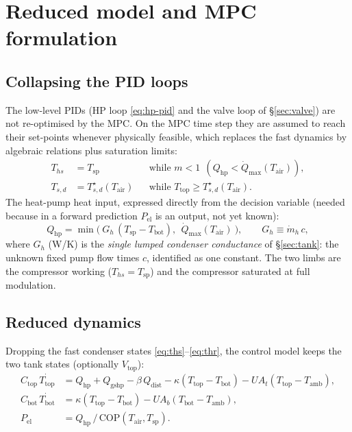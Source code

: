 \documentclass[11pt,a4paper]{article}
\newcommand{\COP}{\mathrm{COP}}
\newcommand{\Qmax}{\dot{Q}_{\max}}
\newcommand{\Ttop}{T_{\mathrm{top}}}
\newcommand{\Tbot}{T_{\mathrm{bot}}}
\newcommand{\Ths}{T_{hs}}          %
\newcommand{\Tsp}{T_{\mathrm{sp}}} %
\newcommand{\Tair}{T_{\mathrm{air}}}
\newcommand{\Tamb}{T_{\mathrm{amb}}}
\newcommand{\Tsd}{T_{s,d}}         %
\newcommand{\Tsdref}{T_{s,d}^{\star}}
\newcommand{\mh}{\dot m_h}         %
\newcommand{\Qhp}{Q_{\mathrm{hp}}}
\newcommand{\Pel}{P_{\mathrm{el}}}
\newcommand{\Vtop}{V_{\mathrm{top}}}
\newcommand{\cw}{c}                %
\begin{document}
\section{Reduced model and MPC formulation}
\label{sec:mpc}

\subsection{Collapsing the PID loops}
The low-level PIDs (HP loop \eqref{eq:hp-pid} and the valve loop of \S\ref{sec:valve}) are not re-optimised
by the MPC. On the MPC time step they are assumed to reach their set-points whenever
physically feasible, which replaces the fast dynamics by algebraic relations plus
saturation limits:
\begin{align}
  \Ths &= \Tsp & &\text{while } m<1 \ \ (\Qhp<\Qmax(\Tair)), \label{eq:collapse1}\\
  \Tsd &= \Tsdref(\Tair) & &\text{while } \Ttop\ge \Tsdref(\Tair). \label{eq:collapse2}
\end{align}
The heat-pump heat input, expressed directly from the decision variable (needed
because in a forward prediction $\Pel$ is an output, not yet known):
\begin{equation}
  \Qhp = \min\!\Big(\ G_h\,(\Tsp-\Tbot),\ \ \Qmax(\Tair)\ \Big),
  \qquad G_h \equiv \mh\,\cw,
  \label{eq:qhp-red}
\end{equation}
where $G_h$ (W/K) is the \emph{single lumped condenser conductance} of
\S\ref{sec:tank}: the unknown fixed pump flow times $\cw$, identified as one
constant. The two limbs are the compressor working ($\Ths=\Tsp$) and the
compressor saturated at full modulation.

\subsection{Reduced dynamics}
Dropping the fast condenser states \eqref{eq:ths}--\eqref{eq:thr}, the control model
keeps the two tank states (optionally $\Vtop$):
\begin{align}
  C_{\mathrm{top}}\,\dot{\Ttop} &=
     \Qhp + Q_{\mathrm{gshp}} - \beta\,Q_{\mathrm{dist}} - \kappa(\Ttop-\Tbot) - UA_t(\Ttop-\Tamb), \label{eq:red-top}\\
  C_{\mathrm{bot}}\,\dot{\Tbot} &=
     \kappa(\Ttop-\Tbot) - UA_b(\Tbot-\Tamb), \label{eq:red-bot}\\
  \Pel &= \Qhp\,/\,\COP(\Tair,\Tsp). \label{eq:red-pel}
\end{align}
\end{document}
